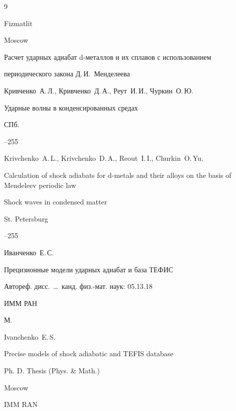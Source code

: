 \begin{thebibliography}{9}

\publ Fizmatlit

\publaddr Moscow






\paper Расчет ударных адиабат d-металлов и их сплавов с использованием

периодического закона Д.\,И.~Менделеева

\by Кривченко~А.\,Л., Кривченко~Д.\,А., Реут~И.\,И., Чуркин~О.\,Ю.

\inbook Ударные волны в конденсированных средах

\publaddr СПб.


--255

\misctransl 

\by Krivchenko~A.\,L., Krivchenko~D.\,A., Reout~I.\,I.,  Churkin~O.\,Yu.

\paper Calculation of shock adiabats for d-metals and their alloys on the basis of Mendeleev periodic law

\inbook Shock waves in condensed matter

\publaddr St. Petersburg


--255




\by Иванченко~Е.\,С.

\thesis Прецизионные модели ударных адиабат и база ТЕФИС 

\thesisinfo Автореф. дисс.~\dots\ канд. физ.-мат. наук: 05.13.18

\publ ИММ РАН

\publaddr М.



\misctransl

\by Ivanchenko~E.\,S.

\thesis Precise models of shock adiabatic and TEFIS database

\thesisinfo Ph. D. Thesis (Phys. \& Math.)

\publaddr Moscow

\publ IMM RAN





\end{thebibliography}





